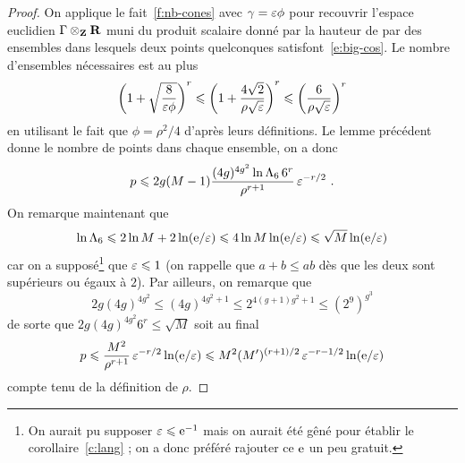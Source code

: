 \begin{proof}
  On applique le fait~\vref{f:nb-cones} avec \( \gamma = \varepsilon\phi \) pour
  recouvrir l'espace euclidien \( \Gamma \otimes_{\mathbf{Z}} {\mathbf{R}} \) muni du produit
  scalaire donné par la hauteur de \NT par des ensembles dans lesquels deux
  points quelconques satisfont~\eqref{e:big-cos}. Le nombre d'ensembles
  nécessaires est au plus
  \begin{equation}
    \left( 1 + \sqrt{ \frac{ 8 }{ \varepsilon\phi } } \right)^r
    \leqslant
    \left( 1 + \frac{ 4\sqrt 2 }{ \rho \sqrt{\varepsilon} } \right)^r
    \leqslant
    \left( \frac{ 6 }{ \rho \sqrt{\varepsilon} } \right)^r
  \end{equation}
  en utilisant le fait que \( \phi = \rho^2 / 4 \) d'après leurs définitions.
  Le lemme précédent donne le nombre de points dans chaque ensemble, on a donc
  \begin{equation}
    p
    \leqslant
    2 g (M-1) \frac{ (4g)^{4g^2} \ln \Lambda_6 \, 6^r }{ \rho^{r+1} }
    \, \varepsilon^{-r/2}
    \text{ .}
  \end{equation}
  On remarque maintenant que
  \begin{equation}
    \ln \Lambda_6
    \leqslant
    2 \ln M + 2 \ln(\mathrm e/\varepsilon)
    \leqslant
    4 \ln M \ln(\mathrm e/\varepsilon)
    \leqslant
    \sqrt M \ln(\mathrm e/\varepsilon)
  \end{equation}
  car on a supposé\footnote{On aurait pu supposer \( \varepsilon \leqslant \mathrm e^{-1} \)
    mais on aurait été gêné pour établir le corollaire~\vref{c:lang} ; on a
    donc préféré rajouter ce \( \mathrm e \) un peu gratuit.} que \( \varepsilon \leqslant 1 \)
  (on rappelle que \( a + b \le ab \) dès que les deux sont supérieurs ou
  égaux à \( 2 \)).  Par ailleurs, on remarque que
  \begin{equation}
    2 g (4g)^{4g^2}
    \le
    (4g)^{4g^2+1}
    \le
    2^{4(g+1)g^2 + 1}
    \le
    (2^9)^{g^3}
  \end{equation}
  de sorte que \( 2 g (4g)^{4g^2} 6^r \le \sqrt M \) soit au final
  \begin{equation}
    p
    \leqslant
    \frac{ M^2 }{ \rho^{r+1} }
    \, \varepsilon^{-r/2} \ln(\mathrm e/\varepsilon)
    \leqslant
    M^2 (M')^{(r+1)/2}
    \, \varepsilon^{-r - 1/2} \ln(\mathrm e/\varepsilon)
  \end{equation}
  compte tenu de la définition de \( \rho \).
\end{proof}

